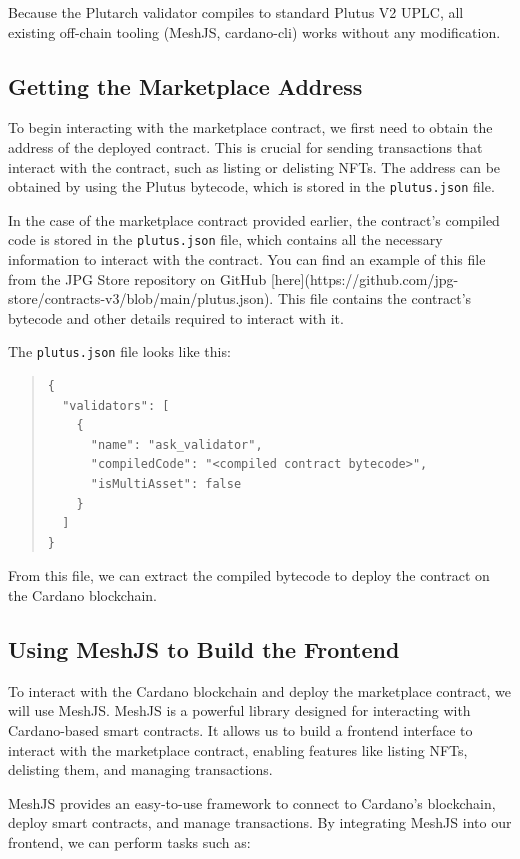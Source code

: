 Because the Plutarch validator compiles to standard Plutus V2 UPLC, all existing off-chain tooling (MeshJS, cardano-cli) works without any modification.

\subsection{Getting the Marketplace Address}

To begin interacting with the marketplace contract, we first need to obtain the address of the deployed contract. This is crucial for sending transactions that interact with the contract, such as listing or delisting NFTs. The address can be obtained by using the Plutus bytecode, which is stored in the \texttt{plutus.json} file.

In the case of the marketplace contract provided earlier, the contract's compiled code is stored in the \texttt{plutus.json} file, which contains all the necessary information to interact with the contract. You can find an example of this file from the JPG Store repository on GitHub [here](https://github.com/jpg-store/contracts-v3/blob/main/plutus.json). This file contains the contract's bytecode and other details required to interact with it.

The \texttt{plutus.json} file looks like this:
\begin{quote}
\begin{verbatim}
{
  "validators": [
    {
      "name": "ask_validator",
      "compiledCode": "<compiled contract bytecode>",
      "isMultiAsset": false
    }
  ]
}
\end{verbatim}
\end{quote}

From this file, we can extract the compiled bytecode to deploy the contract on the Cardano blockchain.

\subsection{Using MeshJS to Build the Frontend}

To interact with the Cardano blockchain and deploy the marketplace contract, we will use MeshJS. MeshJS is a powerful library designed for interacting with Cardano-based smart contracts. It allows us to build a frontend interface to interact with the marketplace contract, enabling features like listing NFTs, delisting them, and managing transactions.

MeshJS provides an easy-to-use framework to connect to Cardano’s blockchain, deploy smart contracts, and manage transactions. By integrating MeshJS into our frontend, we can perform tasks such as:

